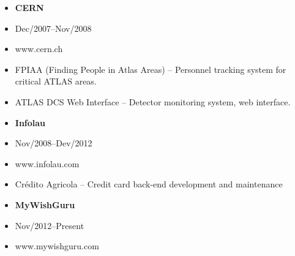 \documentclass[a4paper,english]{article}
\begin{document}
\vspace{0.5cm}
\begin{minipage}[t]{0.5\linewidth}
    \begin{itemize}
    \setlength{\itemsep}{-1mm}
        \item[] {\bf CERN}
        \item[] Dec/2007--Nov/2008
        \item[] www.cern.ch
    \end{itemize}
\end{minipage}
\begin{minipage}[t]{0.5\linewidth}
    \begin{itemize}
    \setlength{\itemsep}{-1mm}
        \item[] FPIAA (Finding People in Atlas Areas) -- Personnel tracking system for critical ATLAS areas.
        \item[] ATLAS DCS Web Interface -- Detector monitoring system, web interface.
    \end{itemize}
\end{minipage}
\vspace{0.5cm}
\begin{minipage}[t]{0.5\linewidth}
    \begin{itemize}
    \setlength{\itemsep}{-1mm}
        \item[] {\bf Infolau}
        \item[] Nov/2008--Dev/2012
        \item[] www.infolau.com
    \end{itemize}
\end{minipage}
\begin{minipage}[t]{0.5\linewidth}
    \begin{itemize}
    \setlength{\itemsep}{-1mm}
        \item[] Crédito Agricola -- Credit card back-end development and maintenance
    \end{itemize}
\end{minipage}
\vspace{0.5cm}
\begin{minipage}[t]{0.5\linewidth}
    \begin{itemize}
    \setlength{\itemsep}{-1mm}
        \item[] {\bf MyWishGuru}
        \item[] Nov/2012--Present
        \item[] www.mywishguru.com
    \end{itemize}
\end{minipage}
\end{document}
